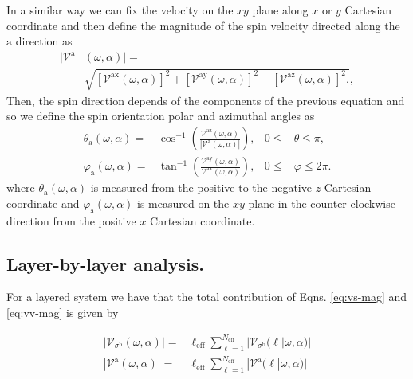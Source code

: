 \documentclass[prb,11pt,tightenlines,twocolumn,aps]{revtex4-1}
\begin{document}
In a similar way we can fix the velocity on the $xy$ plane along $x$ or $y$
Cartesian coordinate and then define the magnitude of the spin velocity directed
along the $\mathrm{a}$ direction as
\begin{align}
|\mathcal{V}^{\mathrm{a}}&(\omega,\alpha)| = \nonumber \\
&\sqrt { 
[\mathcal{V}^{\mathrm{ax}}(\omega,\alpha)]^{2} +
[\mathcal{V}^{\mathrm{ay}}(\omega,\alpha)]^{2} +
[\mathcal{V}^{\mathrm{az}}(\omega,\alpha)]^{2} .
},
\label{eq:vv-mag}
\end{align}
Then, the spin direction depends of the components of the previous equation and
so we define the spin orientation polar and azimuthal angles as
\begin{align}
\theta_{\mathrm{a}}  (\omega,\alpha)
=& 
\cos^{-1} \left( \frac{\mathcal{V}^{\mathrm{az}}(\omega,\alpha)}
{|\mathcal{V}^{\mathrm{a}}(\omega,\alpha)|} \right),
& 0 \leq &\theta \leq \pi, 
\label{eq:polar-ang}
\\
\varphi_{\mathrm{a}} (\omega,\alpha)
=& 
\tan^{-1} \left( \frac{\mathcal{V}^{\mathrm{ay}}(\omega,\alpha)}
{\mathcal{V}^{\mathrm{ax}}(\omega,\alpha)} \right),
& 0 \leq &\varphi \leq 2\pi.
\label{eq:azimuthal-ang} 
\end{align}
where $\theta_{\mathrm{a}}(\omega,\alpha)$ is measured from the positive to the
negative $z$ Cartesian coordinate and $\varphi_{\mathrm{a}}(\omega,\alpha)$ is
measured on the $xy$ plane in the counter-clockwise direction from the positive
$x$ Cartesian coordinate.




\subsection{Layer-by-layer analysis.}\label{sec:theory-layer}

For a layered system we have that the total contribution of Eqns. 
\eqref{eq:vs-mag} and \eqref{eq:vv-mag} is given \cite{arzatePRB14} by 

\begin{align}
|\mathcal{V}_{\sigma^{\mathrm{b}}}(\omega,\alpha)|
=& 
\ell_{\mathrm{eff}}
\sum_{\ell=1}^{N_{\mathrm{eff}}}
|\mathcal{V}_{\sigma^{\mathrm{b}}} (\ell | \omega,\alpha)|
\label{eq:vs-layer}
\\
|\mathcal{V}^{\mathrm{a}}(\omega,\alpha)|
=&
\ell_{\mathrm{eff}}
\sum_{\ell=1}^{N_{\mathrm{eff}}}
|\mathcal{V}^{\mathrm{a}} (\ell | \omega,\alpha)|
\label{eq:vv-layer}
\end{align}
\end{document}
